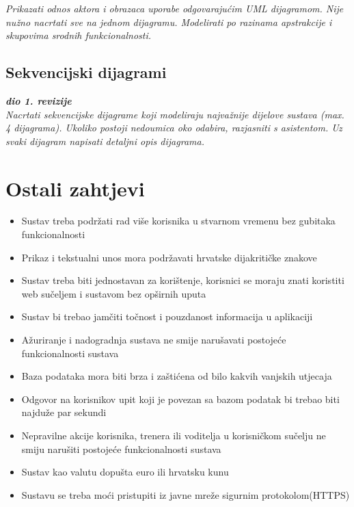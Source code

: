 					\textit{Prikazati odnos aktora i obrazaca uporabe odgovarajućim UML dijagramom. Nije nužno nacrtati sve na jednom dijagramu. Modelirati po razinama apstrakcije i skupovima srodnih funkcionalnosti.}
				\eject		
				
			\subsection{Sekvencijski dijagrami}
				
				\textbf{\textit{dio 1. revizije}}\\
				
				\textit{Nacrtati sekvencijske dijagrame koji modeliraju najvažnije dijelove sustava (max. 4 dijagrama). Ukoliko postoji nedoumica oko odabira, razjasniti s asistentom. Uz svaki dijagram napisati detaljni opis dijagrama.}
				\eject
	
		\section{Ostali zahtjevi}
		
			\begin{itemize}
	        	\item 	Sustav treba podržati rad više korisnika u stvarnom vremenu bez gubitaka funkcionalnosti
	        	\item 	Prikaz i tekstualni unos mora podržavati hrvatske dijakritičke znakove
	        	\item 	Sustav treba biti jednostavan za korištenje, korisnici se moraju znati koristiti web sučeljem i sustavom bez opširnih uputa 
	        	\item 	Sustav bi trebao jamčiti točnost i pouzdanost informacija u aplikaciji
	        	\item 	Ažuriranje i nadogradnja sustava ne smije narušavati postojeće funkcionalnosti sustava
	        	\item 	Baza podataka mora biti brza i zaštićena od bilo kakvih vanjskih utjecaja
	        	\item 	Odgovor na korisnikov upit koji je povezan sa bazom podatak bi trebao biti najduže par sekundi
	        	\item 	Nepravilne akcije korisnika, trenera ili voditelja u korisničkom sučelju ne smiju narušiti postojeće funkcionalnosti sustava
	        	\item 	Sustav kao valutu dopušta euro ili hrvatsku kunu
	        	\item 	Sustavu se treba moći pristupiti iz javne mreže sigurnim protokolom(HTTPS)
        	\end{itemize}
			 
			 
			 
	